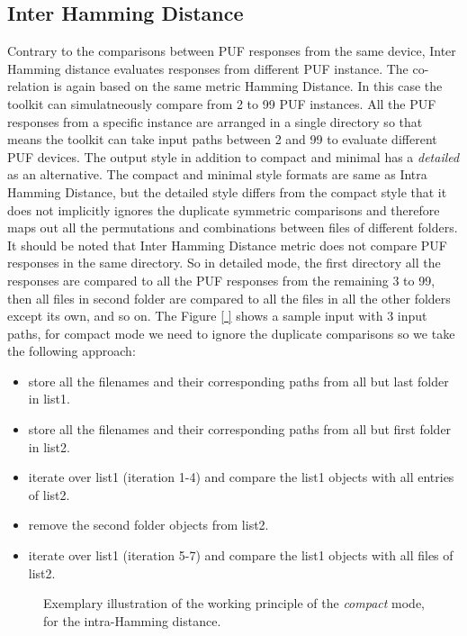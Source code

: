 \subsection{Inter Hamming Distance}
\label{inter_hd_section}
Contrary to the comparisons between PUF responses from the same device, Inter Hamming distance evaluates responses from different PUF instance. The co-relation is again based on the same metric Hamming Distance. In this case the toolkit can simulatneously compare from 2 to 99 PUF instances. All the PUF responses from a specific instance are arranged in a single directory so that means the toolkit can take input paths between 2 and 99 to evaluate different PUF devices. The output
style in addition to compact and minimal has a \emph{detailed} as an alternative. The compact and minimal style formats are same as Intra Hamming Distance, but the detailed style differs from the compact style that it does not implicitly ignores the duplicate symmetric comparisons and therefore maps out all the permutations and combinations between files of different folders. It should be noted that Inter Hamming Distance metric does not compare PUF responses in the same directory. So
in detailed mode, the first directory all the responses are compared to all the PUF responses from the remaining 3 to 99, then all files in second folder are compared to all the files in all the other folders except its own, and so on. The Figure \ref{ } shows a sample input with 3 input paths, for compact mode we need to ignore the duplicate comparisons so we take the following approach:
\begin{itemize}
	\item store all the filenames and their corresponding paths from all but last folder in list1.
	\item store all the filenames and their corresponding paths from all but first folder in list2.
	\item iterate over list1 (iteration 1-4) and compare the list1 objects with all entries of list2.
	\item remove the second folder objects from list2.
	\item iterate over list1 (iteration 5-7) and compare the list1 objects with all files of list2.
\end{itemize}
\begin{figure}
\centering
{}
\caption{Exemplary illustration of the working principle of the \emph{compact} mode, for the intra-Hamming distance.}
\label{img:inter_compact}
\end{figure}

